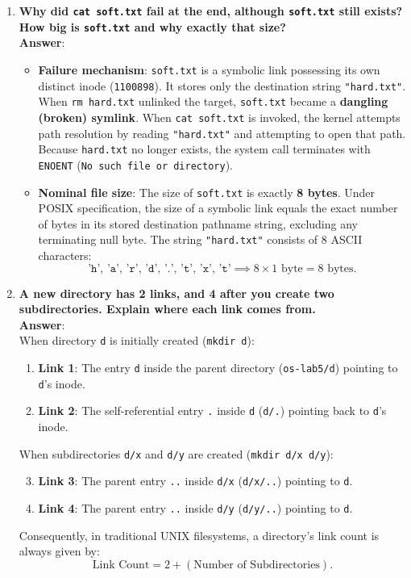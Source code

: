 \documentclass[12pt,a4paper]{article}
\begin{document}
\begin{enumerate}
    \item \textbf{Why did \texttt{cat soft.txt} fail at the end, although \texttt{soft.txt} still exists? How big is \texttt{soft.txt} and why exactly that size?} \\
    \textbf{Answer}:
    \begin{itemize}
        \item \textbf{Failure mechanism}: \texttt{soft.txt} is a symbolic link possessing its own distinct inode (\texttt{1100898}). It stores only the destination string \texttt{"hard.txt"}. When \texttt{rm hard.txt} unlinked the target, \texttt{soft.txt} became a \textbf{dangling (broken) symlink}. When \texttt{cat soft.txt} is invoked, the kernel attempts path resolution by reading \texttt{"hard.txt"} and attempting to open that path. Because \texttt{hard.txt} no longer exists, the system call terminates with \texttt{ENOENT} (\texttt{No such file or directory}).
        \item \textbf{Nominal file size}: The size of \texttt{soft.txt} is exactly \textbf{8 bytes}. Under POSIX specification, the size of a symbolic link equals the exact number of bytes in its stored destination pathname string, excluding any terminating null byte. The string \texttt{"hard.txt"} consists of 8 ASCII characters:
        \[
        \texttt{'h', 'a', 'r', 'd', '.', 't', 'x', 't'} \implies 8 \times 1\text{ byte} = 8\text{ bytes.}
        \]
    \end{itemize}

    \item \textbf{A new directory has 2 links, and 4 after you create two subdirectories. Explain where each link comes from.} \\
    \textbf{Answer}: \\
    When directory \texttt{d} is initially created (\texttt{mkdir d}):
    \begin{enumerate}
        \item \textbf{Link 1}: The entry \texttt{d} inside the parent directory (\texttt{os-lab5/d}) pointing to \texttt{d}'s inode.
        \item \textbf{Link 2}: The self-referential entry \texttt{.} inside \texttt{d} (\texttt{d/.}) pointing back to \texttt{d}'s inode.
    \end{enumerate}
    When subdirectories \texttt{d/x} and \texttt{d/y} are created (\texttt{mkdir d/x d/y}):
    \begin{enumerate}
        \setcounter{enumi}{2}
        \item \textbf{Link 3}: The parent entry \texttt{..} inside \texttt{d/x} (\texttt{d/x/..}) pointing to \texttt{d}.
        \item \textbf{Link 4}: The parent entry \texttt{..} inside \texttt{d/y} (\texttt{d/y/..}) pointing to \texttt{d}.
    \end{enumerate}
    Consequently, in traditional UNIX filesystems, a directory's link count is always given by:
    \[
    \text{Link Count} = 2 + (\text{Number of Subdirectories}).
    \]


\end{enumerate}
\end{document}
